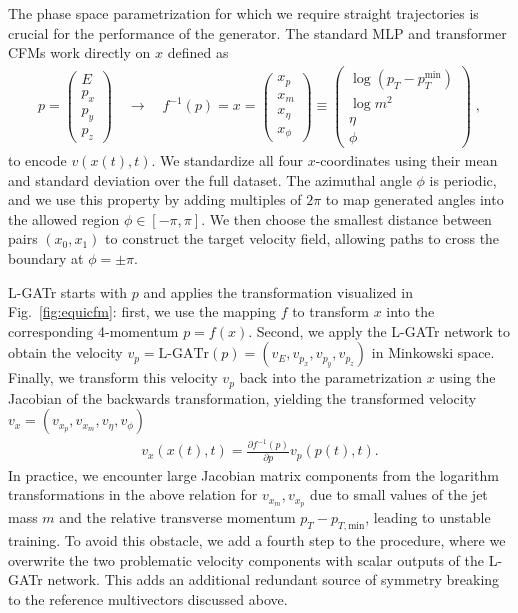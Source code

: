\documentclass[submission, Phys]{SciPost}
\begin{document}
The phase space parametrization for which we require straight trajectories is crucial for the performance of the generator. The standard MLP and transformer CFMs work directly on $x$ defined as 
%
\begin{align}
p =
\begin{pmatrix} 
 E\\p_x\\p_y\\p_z 
\end{pmatrix} 
\quad \to  \quad
f^{-1}(p) = x =  
\begin{pmatrix} 
 x_p  \\ x_m \\ x_\eta \\ x_\phi
\end{pmatrix} 
\equiv
\begin{pmatrix} 
 \log( p_T-p_T^\text{min}) \\ \log m^2 \\ \eta \\ \phi
 \end{pmatrix} \; ,
\label{eq:momentum_rep}
\end{align}
%
to encode $v(x(t),t)$. We standardize all four $x$-coordinates using their mean and standard deviation over the full dataset. The azimuthal angle $\phi$ is periodic, and we use this property by adding multiples of $2\pi$ to map generated angles into the allowed region $\phi\in [-\pi,\pi ]$. We then choose the smallest distance between pairs $(x_0, x_1)$ to construct the target velocity field, allowing paths to cross the boundary at $\phi=\pm \pi$.

L-GATr starts with $p$ and applies the transformation visualized in Fig.~\ref{fig:equicfm}: first, we use the mapping $f$ to transform $x$ into the corresponding 4-momentum $p=f(x)$. Second, we apply the L-GATr network to obtain the velocity $v_p = \text{L-GATr}(p) = (v_E, v_{p_x}, v_{p_y}, v_{p_z})$ in Minkowski space. Finally, we transform this velocity $v_p$ back into the parametrization $x$ using the Jacobian of the backwards transformation, yielding the transformed velocity $v_x=(v_{x_p},v_{x_m},v_\eta, v_\phi)$
%
\begin{align}
    v_x (x(t),t) = \frac{\partial f^{-1}(p)}{\partial p} v_p(p(t), t).
\end{align}
%
In practice, we encounter large Jacobian matrix components from the logarithm transformations in the above relation for $v_{x_m}, v_{x_p}$ due to small values of the jet mass $m$ and the relative transverse momentum $p_T-p_{T,\mathrm{min}}$, leading to unstable training. To avoid this obstacle, we add a fourth step to the procedure, where we overwrite the two problematic velocity components with scalar outputs of the L-GATr network. This adds an additional redundant source of symmetry breaking to the reference multivectors discussed above. 
\end{document}
